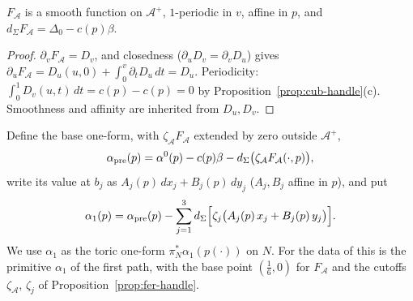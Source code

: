 \begin{lemma}\label{lem:fer-FA}
$F_{\mathcal A}$ is a smooth function on $\mathcal A^+$, $1$-periodic in $v$, affine in $p$, and
$d_\Sigma F_{\mathcal A}=\Delta_0-c(p)\beta$.
\end{lemma}

\begin{proof}
$\partial_vF_{\mathcal A}=D_v$, and closedness ($\partial_uD_v=\partial_vD_u$) gives $\partial_uF_{\mathcal A}=D_u(u,0)+\int_0^v\partial_tD_u\,dt=D_u$. Periodicity: $\int_0^1D_v(u,t)\,dt=c(p)-c(p)=0$ by Proposition~\ref{prop:cub-handle}(c). Smoothness and affinity are inherited from $D_u,D_v$.
\end{proof}

\begin{construction}\label{cons:fer-alpha1}
Define the base one-form, with $\zeta_{\mathcal A}F_{\mathcal A}$ extended by zero outside $\mathcal A^+$,
\[
 \alpha_{\rm pre}(p)=\alpha^0(p)-c(p)\beta-d_\Sigma\big(\zeta_{\mathcal A}F_{\mathcal A}(\cdot,p)\big),
\]
write its value at $b_j$ as $A_j(p)\,dx_j+B_j(p)\,dy_j$ ($A_j,B_j$ affine in $p$), and put
\begin{equation}\label{eq:fer-alpha1}
 \alpha_1(p)=\alpha_{\rm pre}(p)-\sum_{j=1}^3d_\Sigma\Big[\zeta_j\big(A_j(p)\,x_j+B_j(p)\,y_j\big)\Big].
\end{equation}
We use $\alpha_1$ as the toric one-form $\pi_N^*\alpha_1(p(\cdot))$ on $N$. For the data of  this is the
primitive $\alpha_1$ of the first path, with the base point $(\frac16,0)$ for $F_{\mathcal A}$ and the cutoffs
$\zeta_{\mathcal A}$, $\zeta_j$ of Proposition~\ref{prop:fer-handle}.
\end{construction}

